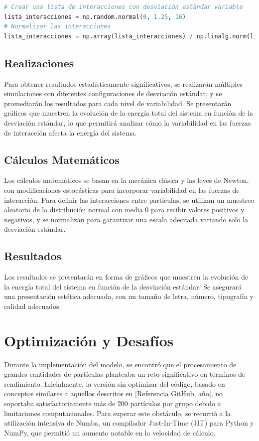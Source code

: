 \begin{itemize}
\begin{lstlisting}[language=Python]  
# Crear una lista de interacciones con desviación estándar variable
lista_interacciones = np.random.normal(0, 1.25, 16)   
# Normalizar las interacciones
lista_interacciones = np.array(lista_interacciones) / np.linalg.norm(lista_interacciones)
\end{lstlisting}

\subsection{Realizaciones}
Para obtener resultados estadísticamente significativos, se realizarán múltiples simulaciones con diferentes configuraciones de desviación estándar, y se promediarán los resultados para cada nivel de variabilidad. Se presentarán gráficos que muestren la evolución de la energía total del sistema en función de la desviación estándar, lo que permitirá analizar cómo la variabilidad en las fuerzas de interacción afecta la energía del sistema.

\subsection{Cálculos Matemáticos}
Los cálculos matemáticos se basan en la mecánica clásica y las leyes de Newton, con modificaciones estocásticas para incorporar variabilidad en las fuerzas de interacción. Para definir las interacciones entre partículas, se utilizan un muestreo aleatorio de la distribución normal con media 0 para recibir valores positivos y negativos, y se normalizan para garantizar una escala adecuada variando solo la desviación estándar.
\subsection{Resultados}
Los resultados se presentarán en forma de gráficos que muestren la evolución de la energía total del sistema en función de la desviación estándar. Se asegurará una presentación estética adecuada, con un tamaño de letra, número, tipografía y calidad adecuados.

\section{Optimización y Desafíos}

Durante la implementación del modelo, se encontró que el procesamiento de grandes cantidades de partículas planteaba un reto significativo en términos de rendimiento. Inicialmente, la versión sin optimizar del código, basado en conceptos similares a aquellos descritos en [Referencia GitHub, año], no soportaba satisfactoriamente más de 200 partículas por grupo debido a limitaciones computacionales. Para superar este obstáculo, se recurrió a la utilización intensiva de Numba, un compilador Just-In-Time (JIT) para Python y NumPy, que permitió un aumento notable en la velocidad de cálculo.


\end{itemize}
